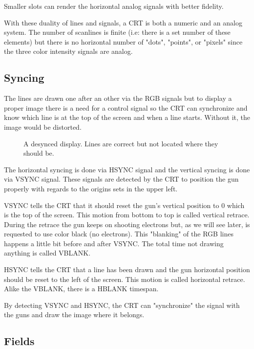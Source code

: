 Smaller slots can render the horizontal analog signals with better fidelity.





 With these duality of lines and signals, a CRT is both a numeric and an analog system. The number of scanlines is finite (i.e: there is a set number of these elements) but there is no horizontal number of "dots", "points", or "pixels" since the three color intensity signals are analog.


\subsection{Syncing}
The lines are drawn one after an other via the RGB signals but to display a proper image there is a need for a control signal so the CRT can synchronize and know which line is at the top of the screen and when a line starts. Without it, the image would be distorted. 


\begin{figure}[H]
\caption*{A desynced display. Lines are correct but not located where they should be.}
\end{figure}





The horizontal syncing is done via HSYNC signal and the vertical syncing is done via VSYNC signal. These signals are detected by the CRT to position the gun properly with regards to the origins sets in the upper left.

VSYNC tells the CRT that it should reset the gun's vertical position to 0 which is the top of the screen. This motion from bottom to top is called vertical retrace. During the retrace the gun keeps on shooting electrons but, as we will see later, is requested to use color black (no electrons). This "blanking" of the RGB lines happens a little bit before and after VSYNC. The total time not drawing anything is called VBLANK.

HSYNC tells the CRT that a line has been drawn and the gun horizontal position should be reset to the left of the screen. This motion is called horizontal retrace. Alike the VBLANK, there is a HBLANK timespan.

By detecting VSYNC and HSYNC, the CRT can "synchronize" the signal with the guns and draw the image where it belongs.



\pagebreak
\subsection{Fields}

